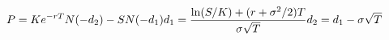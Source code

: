 \documentclass[preview]{standalone}
\begin{document}
\begin{align*}
\special{dvisvgm:raw <g id='unique000'>}P = Ke^{-rT}N(-d_2) - SN(-d_1) \special{dvisvgm:raw </g>}\special{dvisvgm:raw <g id='unique001'>}d_1 = \frac{\ln(S/K)+(r+\sigma^2/2)T}{\sigma\sqrt{T}} \special{dvisvgm:raw </g>}\special{dvisvgm:raw <g id='unique002'>}d_2 = d_1 - \sigma\sqrt{T}\special{dvisvgm:raw </g>}
\end{align*}
\end{document}
